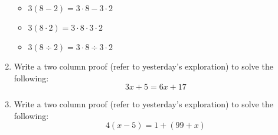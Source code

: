 \documentclass[12pt,letterpaper]{article}
\begin{document}
\begin{enumerate}
          \begin{itemize}
              \item $3(8-2)=3\cdot8-3\cdot2$
              \item $3(8\cdot2)=3\cdot8\cdot3\cdot2$
              \item $3(8\div2)=3\cdot8\div3\cdot2$
          \end{itemize}
    \item Write a two column proof (refer to yesterday's exploration) to solve the following: $$3x+5=6x+17$$
    \item Write a two column proof (refer to yesterday's exploration) to solve the following: $$4(x-5)=1+(99+x)$$

\end{enumerate}
\end{document}
